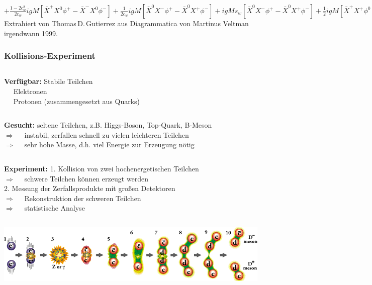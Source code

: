 \documentclass[10pt,t]{beamer}
\begin{document}
\begin{frame}
{\begin{minipage}{17cm}
\begin{math}
            +\frac{1-2c^{2}_{w}}{2c_{w}}igM[\bar{X}^{+}X^{0}\phi^{+}-\bar{X}^{-}X^{0}\phi^{-}]
            +\frac{1}{2c_{w}}igM[\bar{X}^{0}X^{-}\phi^{+}-\bar{X}^{0}X^{+}\phi^{-}]
            +igMs_{w}[\bar{X}^{0}X^{-}\phi^{+}-\bar{X}^{0}X^{+}\phi^{-}]
            +\frac{1}{2}igM[\bar{X}^{+}X^{+}\phi^{0}-\bar{X}^{-}X^{-}\phi^{0}]
        \end{math}
        \\[2ex]
        Extrahiert von Thomas\,D.\,Gutierrez aus Diagrammatica von Martinus Veltman irgendwann 1999.\cite{web:stml}
    \end{minipage}
}
\end{frame}


\begin{frame}
\frametitle{Kollisions-Experiment}
\vspace*{-2\baselineskip}
\begin{columns}
\textbf{Verfügbar:}
Stabile Teilchen \\
    \qquad\textbullet~~ Elektronen \\
    \qquad\textbullet~~ Protonen (zusammengesetzt aus Quarks)
\end{columns}
\vspace*{1ex}
\begin{columns}
\textbf{Gesucht:}
seltene Teilchen, z.B. Higgs-Boson, Top-Quark, B-Meson \\
    \qquad$\Rightarrow$~~ instabil, zerfallen schnell zu vielen leichteren Teilchen \\
    \qquad$\Rightarrow$~~ sehr hohe Masse, d.h. viel Energie zur Erzeugung nötig
\end{columns}
\vspace*{1ex}
\begin{columns}
\textbf{Experiment:}
1. Kollision von zwei hochenergetischen Teilchen \\
    \qquad$\Rightarrow$~~ schwere Teilchen können erzeugt werden \\[1ex]
    2. Messung der Zerfallsprodukte mit großen Detektoren \\
    \qquad$\Rightarrow$~~ Rekonstruktion der schweren Teilchen \\
    \qquad$\Rightarrow$~~ statistische Analyse
\end{columns}
\vspace*{1ex}
\includegraphics[width=\textwidth]{teilchenphysik-kollision}
\end{frame}
\end{document}
